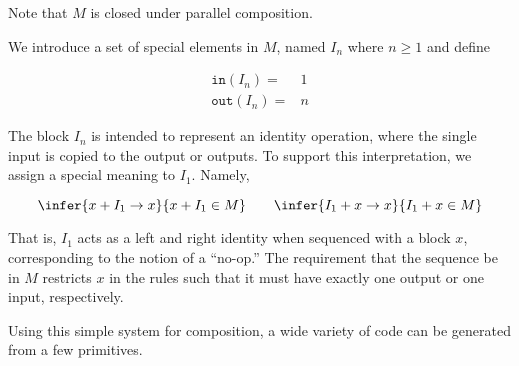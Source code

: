 Note that $M$ is closed under parallel composition.

We introduce a set of special elements in $M$, named $I_n$ where $n \geq 1$
and define

\begin{eqnarray*}
\mathtt{in} (I_n) =& 1\\
\mathtt{out}(I_n) =& n
\end{eqnarray*}

The block $I_n$ is intended to represent an identity operation, where the
single input is copied to the output or outputs. To support this
interpretation, we assign a special meaning to $I_1$. Namely,

\[
\infer{x + I_1 \to x}{x + I_1 \in M} 
\qquad
\infer{I_1 + x \to x}{I_1 + x \in M}
\]

That is, $I_1$ acts as a left and right identity when sequenced with a block
$x$, corresponding to the notion of a ``no-op.'' The requirement that the
sequence be in $M$ restricts $x$ in the rules such that it must have exactly
one output or one input, respectively.

Using this simple system for composition, a wide variety of code can be
generated from a few primitives.
